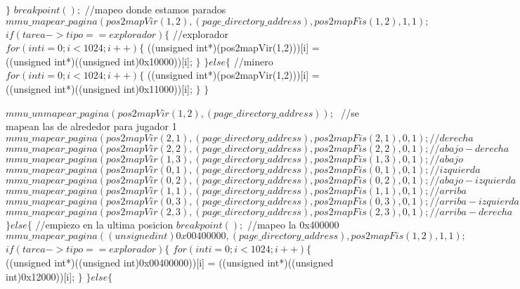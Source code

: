 \begin{algorithmic}
       \State \tab \tab \tab $ \} $
  \State \tab \tab \tab $   breakpoint();$
    //mapeo donde estamos parados
  \State \tab \tab \tab $   mmu\_mapear\_pagina(pos2mapVir(1,2), (page\_directory\_address), pos2mapFis(1,2), 1, 1);$
  \State \tab \tab \tab $   if (tarea->tipo == explorador) \{$
      //explorador
      \State \tab \tab \tab \tab $ for (int i = 0; i < 1024; i++) \{$
        ((unsigned int*)(pos2mapVir(1,2)))[i] = ((unsigned int*)((unsigned int)0x10000))[i];
      \State \tab \tab \tab \tab $ \}$
  \State \tab \tab \tab $   \} else \{$
      //minero
      \State \tab \tab \tab \tab $ for (int i = 0; i < 1024; i++) \{$
        ((unsigned int*)(pos2mapVir(1,2)))[i] = ((unsigned int*)((unsigned int)0x11000))[i];
     \State \tab \tab \tab \tab $  \}$
  \State \tab \tab \tab $   \}$

  \State \tab \tab \tab $   mmu\_unmapear\_pagina(pos2mapVir(1,2), (page\_directory\_address));$
\State \tab \tab \tab $ $
    //se mapean las de alrededor para jugador 1
  \State \tab \tab \tab $   mmu\_mapear\_pagina(pos2mapVir(2,1), (page\_directory\_address), pos2mapFis(2,1), 0, 1);//derecha$
  \State \tab \tab \tab $   mmu\_mapear\_pagina(pos2mapVir(2,2), (page\_directory\_address), pos2mapFis(2,2), 0, 1);//abajo-derecha$
  \State \tab \tab \tab $   mmu\_mapear\_pagina(pos2mapVir(1,3), (page\_directory\_address), pos2mapFis(1,3), 0, 1);//abajo$
  \State \tab \tab \tab $   mmu\_mapear\_pagina(pos2mapVir(0,1), (page\_directory\_address), pos2mapFis(0,1), 0, 1);//izquierda$
  \State \tab \tab \tab $   mmu\_mapear\_pagina(pos2mapVir(0,2), (page\_directory\_address), pos2mapFis(0,2), 0, 1);//abajo-izquierda$
  \State \tab \tab \tab $   mmu\_mapear\_pagina(pos2mapVir(1,1), (page\_directory\_address), pos2mapFis(1,1), 0, 1);//arriba$
  \State \tab \tab \tab $   mmu\_mapear\_pagina(pos2mapVir(0,3), (page\_directory\_address), pos2mapFis(0,3), 0, 1);//arriba-izquierda$
  \State \tab \tab \tab $   mmu\_mapear\_pagina(pos2mapVir(2,3), (page\_directory\_address), pos2mapFis(2,3), 0, 1);//arriba-derecha$
 \State \tab \tab $ \} else \{$
    //empiezo en la ultima posicion
  \State \tab \tab \tab $   breakpoint();$
    //mapeo la 0x400000
  \State \tab \tab \tab $   mmu\_mapear\_pagina((unsigned int)0x00400000, (page\_directory\_address), pos2mapFis(1,2), 1, 1);$
  \State \tab \tab \tab $   if (tarea->tipo == explorador) \{$
      \State \tab \tab \tab \tab $ for (int i = 0; i < 1024; i++) \{$
        ((unsigned int*)((unsigned int)0x00400000))[i] = ((unsigned int*)((unsigned int)0x12000))[i];
      \State \tab \tab \tab \tab $ \}$
  \State \tab \tab \tab $   \} else \{$

\end{algorithmic}
